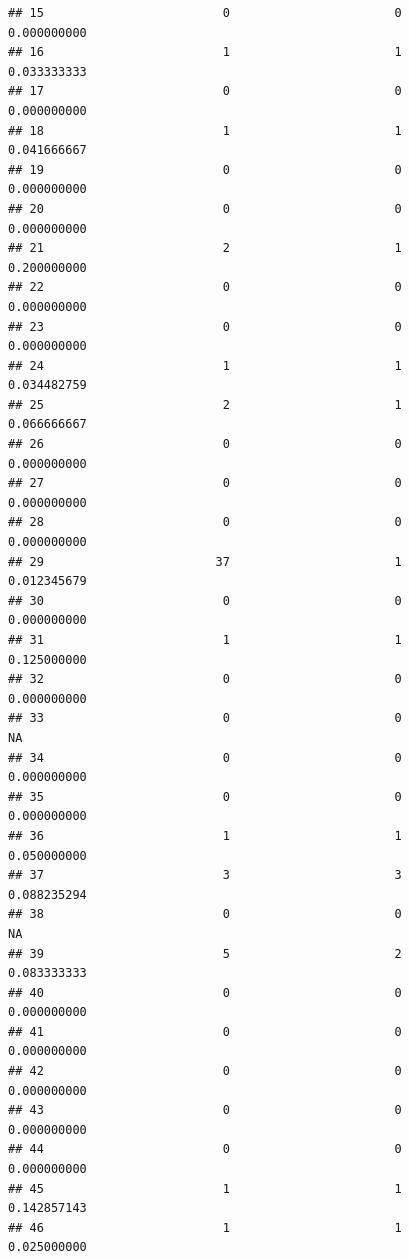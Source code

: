 \documentclass[
]{article}
\begin{document}
\begin{verbatim}
## 15                         0                       0               0.000000000
## 16                         1                       1               0.033333333
## 17                         0                       0               0.000000000
## 18                         1                       1               0.041666667
## 19                         0                       0               0.000000000
## 20                         0                       0               0.000000000
## 21                         2                       1               0.200000000
## 22                         0                       0               0.000000000
## 23                         0                       0               0.000000000
## 24                         1                       1               0.034482759
## 25                         2                       1               0.066666667
## 26                         0                       0               0.000000000
## 27                         0                       0               0.000000000
## 28                         0                       0               0.000000000
## 29                        37                       1               0.012345679
## 30                         0                       0               0.000000000
## 31                         1                       1               0.125000000
## 32                         0                       0               0.000000000
## 33                         0                       0                        NA
## 34                         0                       0               0.000000000
## 35                         0                       0               0.000000000
## 36                         1                       1               0.050000000
## 37                         3                       3               0.088235294
## 38                         0                       0                        NA
## 39                         5                       2               0.083333333
## 40                         0                       0               0.000000000
## 41                         0                       0               0.000000000
## 42                         0                       0               0.000000000
## 43                         0                       0               0.000000000
## 44                         0                       0               0.000000000
## 45                         1                       1               0.142857143
## 46                         1                       1               0.025000000

\end{verbatim}
\end{document}
